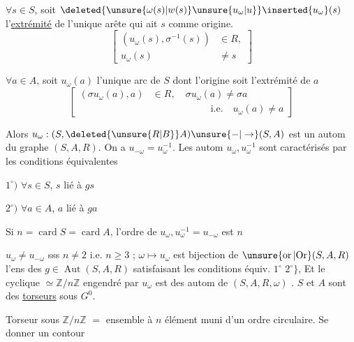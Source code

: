 $\forall s\in S$, soit $\deleted{\unsure{\omega(s)|w(s)}\unsure{u_{\omega}|u}}\inserted{u_{\omega}}(s)$ l'\uline{extrémité} de l'unique arête  qui ait  $s$ comme origine.
\[
\left[\begin{aligned}(u_{\omega}(s),\sigma^{-1}(s))&\in R,\\u_{\omega}(s)&\ne s\end{aligned}\right]
\]

$\forall a\in A$, soit $u_{\omega}(a)$ l'unique arc de $S$ dont l'origine soit l'extrémité de $a$
\[
\left[\begin{aligned}
(\sigma u_{\omega}(a),a)&\in R,\quad \sigma u_{\omega}(a)\ne\sigma a\\
&\hspace{6em}\text{i.e.}\quad u_{\omega}(a)\ne a
\end{aligned}\right]
\]

\margin{$\big\}$}Alors $u_{\omega}:(S,\deleted{\unsure{R|B}}A)\unsure{-|\to}(S,A)$ est un autom du graphe $(S,A,R)$. On a $u_{-\omega}=u_{\omega}^{-1}$. Les autom $u_{\omega},u_{\omega}^{-1}$ sont caractérisés par les  conditions équivalentes

$1^{\circ})$ $\forall s\in S$, $s$ lié à $gs$

$2^{\circ})$ $\forall a\in A$, $a$ lié à $ga$

Si $n=\operatorname{card}S=\operatorname{card}A$, l'ordre de $u_{\omega},u_{\omega}^{-1}=u_{-\omega}$ est $n$

 $u_{\omega}\ne u_{-\omega}$ sss $n\ne2$ i.e. $n\geq3$ ;  $\omega\longmapsto u_{\omega}$ est bijection de $\unsure{\operatorname{or}|{\rm Or}}(S,A,R)$  l'ens des $g\in\operatorname{Aut}(S,A,R)$ satisfaisant les conditions équiv. $1^{\circ}$  $2^{\circ}\big\}$, Et le  cyclique $\simeq\mathbb{Z}/n\mathbb{Z}$ engendré par $u_{\omega}$ est    des autom  de $(S,A,R,\omega)$ . $S$ et $A$ sont des \uline{torseurs} sous $G^{0}$.


Torseur sous $\mathbb{Z}/n\mathbb{Z}$  $=$ ensemble à $n$ élément muni d'un ordre \unsure{$^{\times}$|$^{*}$} circulaire. Se donner un contour
\normalmarginpar
